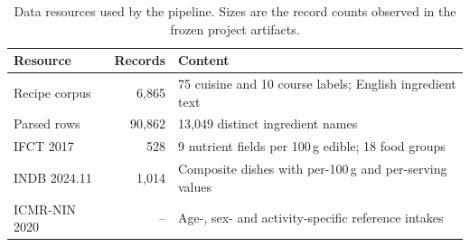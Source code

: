 \begin{table}[t]
\caption{Data resources used by the pipeline. Sizes are the record counts
observed in the frozen project artifacts.}
\label{tab:datasets}
\centering
\footnotesize
\setlength{\tabcolsep}{4pt}
\begin{tabular}{@{}p{1.95cm}rp{2.55cm}@{}}
\toprule
\textbf{Resource} & \textbf{Records} & \textbf{Content} \\
\midrule
Recipe corpus & 6{,}865 & 75 cuisine and 10 course labels; English ingredient text \\
Parsed rows & 90{,}862 & 13{,}049 distinct ingredient names \\
IFCT 2017 & 528 & 9 nutrient fields per 100\,g edible; 18 food groups \\
INDB 2024.11 & 1{,}014 & Composite dishes with per-100\,g and per-serving values \\
ICMR-NIN 2020 & -- & Age-, sex- and activity-specific reference intakes \\
\bottomrule
\end{tabular}
\end{table}
